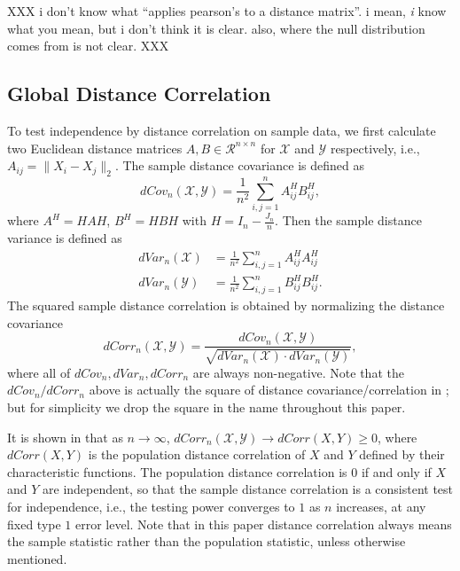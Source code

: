 \documentclass[11pt]{article}
\begin{document}
XXX i don't know what ``applies pearson's to a distance matrix''.  i mean, \emph{i} know what you mean, but i don't think it is clear.  also, where the null distribution comes from is not clear.  XXX



\subsection{Global Distance Correlation}
\label{main1}


To test independence by distance correlation on sample data, we first calculate two Euclidean distance matrices $A, B \in \mathcal{R}^{n \times n}$ for $\mathcal{X}$ and $\mathcal{Y}$ respectively, i.e., $A_{ij}=\|X_{i}-X_{j}\|_{2}$. The sample distance covariance is defined as
\begin{equation}
\label{dCovEqu}
dCov_{n}(\mathcal{X},\mathcal{Y})=\frac{1}{n^2}\sum_{i,j=1}^{n}A^{H}_{ij}B^{H}_{ij},
\end{equation}
where $A^{H}=HAH$, $B^{H}=HBH$ with $H=I_{n}-\frac{J_{n}}{n}$. Then the sample distance variance is defined as
\begin{align*}
dVar_{n}(\mathcal{X}) &=\frac{1}{n^2}\sum_{i,j=1}^{n}A^{H}_{ij}A^{H}_{ij}\\
dVar_{n}(\mathcal{Y}) &=\frac{1}{n^2}\sum_{i,j=1}^{n}B^{H}_{ij}B^{H}_{ij}.
\end{align*}
The squared sample distance correlation is obtained by normalizing the distance covariance
\begin{equation}
\label{dCorrEqu}
dCorr_{n}(\mathcal{X},\mathcal{Y})=\frac{dCov_{n}(\mathcal{X},\mathcal{Y})}{\sqrt{dVar_{n}(\mathcal{X}) \cdot dVar_{n}(\mathcal{Y})}},
\end{equation}
where all of $dCov_{n}, dVar_{n}, dCorr_{n}$ are always non-negative. Note that the $dCov_{n}/dCorr_{n}$ above is actually the square of distance covariance/correlation in \cite{SzekelyRizzoBakirov2007}; but for simplicity we drop the square in the name throughout this paper.

It is shown in \cite{SzekelyRizzoBakirov2007} that as $n \rightarrow \infty$, $dCorr_{n}(\mathcal{X},\mathcal{Y}) \rightarrow dCorr(X,Y) \geq 0$, where $dCorr(X,Y)$ is the population distance correlation of $X$ and $Y$ defined by their characteristic functions. The population distance correlation is $0$ if and only if $X$ and $Y$ are independent, so that the sample distance correlation is a consistent test for independence, i.e., the testing power converges to $1$ as $n$ increases, at any fixed type $1$ error level. Note that in this paper distance correlation always means the sample statistic rather than the population statistic, unless otherwise mentioned.
\end{document}
